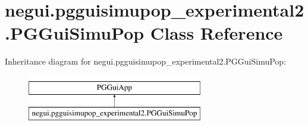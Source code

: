 \hypertarget{classnegui_1_1pgguisimupop__experimental2_1_1PGGuiSimuPop}{}\section{negui.\+pgguisimupop\+\_\+experimental2.\+P\+G\+Gui\+Simu\+Pop Class Reference}
\label{classnegui_1_1pgguisimupop__experimental2_1_1PGGuiSimuPop}
Inheritance diagram for negui.\+pgguisimupop\+\_\+experimental2.\+P\+G\+Gui\+Simu\+Pop\+:\begin{figure}[H]
\begin{center}
\leavevmode
\includegraphics[height=2.000000cm]{classnegui_1_1pgguisimupop__experimental2_1_1PGGuiSimuPop}
\end{center}
\end{figure}
